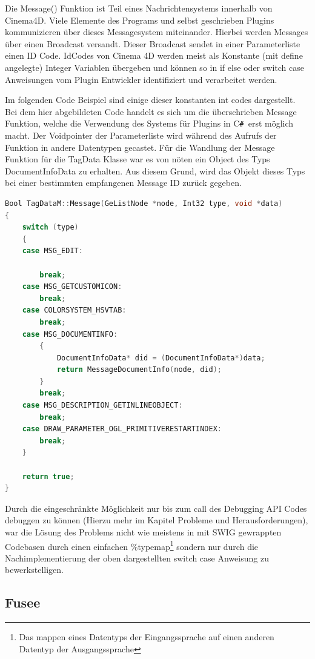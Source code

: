 \documentclass[pagesize, paper=a4, fontsize=12pt,titlepage=true, headings=small, headnosepline, abstractoff, liststotoc, nochapterprefix, plainheadsepline, twoside]{scrreprt}
\newcommand{\CSS}{C\texttt{\# }}
\begin{document}
Die Message() Funktion ist Teil eines Nachrichtensystems innerhalb von Cinema4D. Viele Elemente des Programs und selbst geschrieben Plugins kommunizieren über dieses Messagesystem miteinander. Hierbei werden Messages über einen Broadcast versandt. Dieser Broadcast sendet in einer Parameterliste einen ID Code. IdCodes von Cinema 4D werden meist als Konstante (mit define angelegte) Integer Variablen übergeben und können so in if else oder switch case Anweisungen vom Plugin Entwickler identifiziert und verarbeitet werden.

Im folgenden Code Beispiel sind einige dieser konstanten int codes dargestellt. Bei dem hier abgebildeten Code handelt es sich um die überschrieben Message Funktion, welche die Verwendung des Systems für Plugins in \CSS erst möglich macht. Der Voidpointer der Parameterliste wird während des Aufrufs der Funktion in andere Datentypen gecastet. Für die Wandlung der Message Funktion für die TagData Klasse war es von nöten ein Object des Typs DocumentInfoData zu erhalten. Aus diesem Grund, wird das Objekt dieses Typs bei einer bestimmten empfangenen Message ID zurück gegeben.
\begin{lstlisting}[language=C++, caption = Überschreiben der Message Funktion des TagData Datenty<ps.]
Bool TagDataM::Message(GeListNode *node, Int32 type, void *data)
{
	switch (type)
	{
	case MSG_EDIT:

		break;
	case MSG_GETCUSTOMICON:
		break;
	case COLORSYSTEM_HSVTAB:
		break;
	case MSG_DOCUMENTINFO:
		{
			DocumentInfoData* did = (DocumentInfoData*)data;
			return MessageDocumentInfo(node, did);
		}
		break;
	case MSG_DESCRIPTION_GETINLINEOBJECT:
		break;
	case DRAW_PARAMETER_OGL_PRIMITIVERESTARTINDEX:
		break;
	}

	return true;
}
\end{lstlisting}

Durch die eingeschränkte  Möglichkeit nur bis zum call des Debugging API Codes debuggen zu können (Hierzu mehr im Kapitel Probleme und Herausforderungen), war die Lösung des Problems nicht wie meistens in mit SWIG gewrappten Codebasen durch einen einfachen \%typemap\footnote{Das mappen eines Datentyps der Eingangssprache auf einen anderen Datentyp der Ausgangssprache} sondern nur durch die Nachimplementierung der oben dargestellten switch case Anweisung zu bewerkstelligen. 

\subsection{Fusee}
\end{document}
